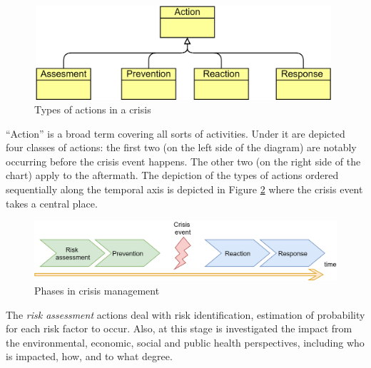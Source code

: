\begin{Center}
\begin{figure}[H]
	\begin{Center}
		\includegraphics[width=4.36in,height=1.37in]{images/image6.png}
		\caption{Types of actions in a crisis}
		\label{fig:Types_of_actions_in_a_crisis}
	\end{Center}
\end{figure}
\end{Center}

``Action''  is a broad term covering all sorts of activities. Under it are depicted four classes of actions: the first two (on the left side of the diagram) are notably occurring before the crisis event happens. The other two (on the right side of the chart) apply to the aftermath. The depiction of the types of actions ordered sequentially along the temporal axis is depicted in Figure \ref{fig:Phases_in_crisis_management} where the crisis event takes a central place. 

\begin{Center}

\begin{figure}[H]
	\begin{Center}
		\includegraphics[width=\textwidth]{images/image4.png}
		\caption{Phases in crisis management}
		\label{fig:Phases_in_crisis_management}
	\end{Center}
\end{figure}
\end{Center}

The \textit{risk assessment} actions deal with risk identification, estimation of probability for each risk factor to occur. Also, at this stage is investigated the impact from the environmental, economic, social and public health perspectives, including who is impacted, how, and to what degree. 

